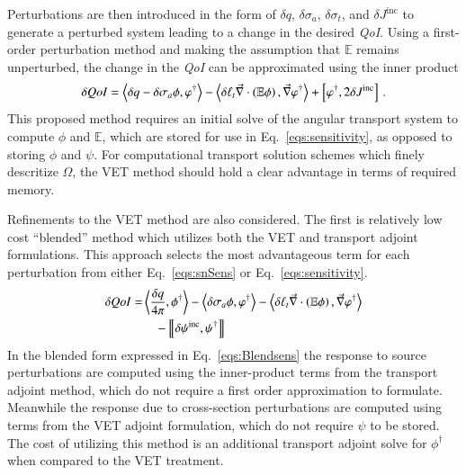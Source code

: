 \documentclass{anstrans}
\newcommand{\bra}{\left\langle}
\newcommand{\ket}{\right\rangle}
\newcommand{\sbraSN}{\left[ \! \left[}
\newcommand{\sketSN}{\right] \! \right]}
\newcommand{\sbra}{\left[}
\newcommand{\sket}{\right]}
\renewcommand{\div}{\vec{\nabla} \cdot}
\newcommand{\grad}{\vec{\nabla}}
\newcommand{\vefadj}{\varphi^\dag}
\newcommand{\Edd}{\mathbb{E}}
\newcommand{\sigt}{\sigma_t}
\newcommand{\siga}{\sigma_a}
\newcommand{\isigt}{\ell_t}
\newcommand{\angSourced}{\frac{\delta q}{4 \pi}}
\newcommand{\scalSource}{q}
\newcommand{\qoi}{{\it QoI}\xspace}
\begin{document}
Perturbations are then introduced in the form of $\delta q$, $\delta \siga$, $\delta \sigt$, and $\delta J^{\text{inc}}$ to generate a perturbed system leading to a change in the desired \qoi. Using a first-order perturbation method and making the assumption that $\Edd$ remains unperturbed, the change in the \qoi can be approximated using the inner product
\begin{equation}\label{eqs:sensitivity}
\delta \qoi =  \bra \delta \scalSource - \delta \siga \phi, \vefadj \ket  - \bra \delta \isigt \div \left( \Edd \phi \right) , \grad \vefadj \ket
 + \sbra \vefadj, 2 \delta J^{\text{inc}} \sket \,.
\end{equation}
This proposed method requires an initial solve of the angular transport system to compute $\phi$ and $\Edd$, which are stored for use in Eq.~\eqref{eqs:sensitivity}, as opposed to storing $\phi$ and $\psi$. For computational transport solution schemes which finely descritize $\Omega$, the VET method should hold a clear advantage in terms of required memory. 

Refinements to the VET method are also considered. The first is relatively low cost ``blended'' method which utilizes both the VET and transport adjoint formulations. This approach selects the most advantageous term for each perturbation from either Eq.~\eqref{eqs:snSens} or Eq.~\eqref{eqs:sensitivity}.  
\begin{equation}
\label{eqs:Blendsens}
\begin{split}
\delta \qoi =&  \bra \angSourced , \phi^\dag \ket - \bra \delta \siga \phi, \vefadj \ket - \bra \delta \isigt \div \left( \Edd \phi \right) , \grad \vefadj \ket\\
&\quad - \sbraSN \delta \psi^\text{inc}, \psi^\dag \sketSN \\
\end{split}
\end{equation}
In the blended form expressed in Eq.~\eqref{eqs:Blendsens} the response to source perturbations are computed using the inner-product terms from the transport adjoint method, which do not require a first order approximation to formulate. Meanwhile the response due to cross-section perturbations are computed using terms from the VET adjoint formulation, which do not require $\psi$ to be stored. The cost of utilizing this method is an additional transport adjoint solve for $\phi^\dag$ when compared to the VET treatment.
\end{document}
